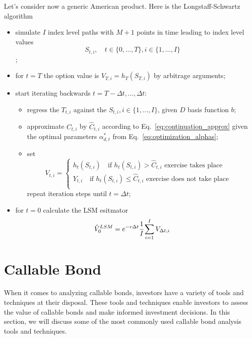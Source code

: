 \documentclass[12pt,a4paper]{article}
\begin{document}
Let's consider now a generic American product. Here is the Longstaff-Schwartz algorithm
\begin{itemize}
	\item simulate $I$ index level paths with $M+1$ points in time leading to index level values
	\begin{equation*}
		S_{t,i},\quad t \in \{0,\ldots,T\}, i \in \{1,\ldots,I\}
	\end{equation*};
\item for $t=T$ the option value is $V_{T,i}=h_T(S_{T,i})$ by arbitrage arguments;
\item start iterating backwards $t = T-\Delta t, \ldots,\Delta t$:
\begin{itemize}
	\item regress the $T_{t,i}$ against the $S_{t,i}, i\in \{1,\ldots, I\}$, given $D$ basis function $b$;
	\item approximate $C_{t,i}$ by $\hat{C}_{t,i}$ according to Eq.~\ref{eq:continuation_approx} given the optimal parameters $\alpha^*_{d,t}$ from Eq.~\ref{eq:optimization_alphas};
	\item set 
	\begin{equation*}
		V_{t,i}=
		\begin{cases}
			h_t(S_{t,i})\quad\text{if }h_t(S_{t,i})>\hat{C}_{t,i}\text{ exercise takes place}\\
			Y_{t,i}\quad\text{if }h_t(S_{t,i})\leq\hat{C}_{t,i}\text{ exercise does not take place}\\
		\end{cases}
	\end{equation*}
	repeat iteration steps until $t=\Delta t$;
\end{itemize} 
\item for $t=0$ calculate the LSM esitmator
\begin{equation}
	\hat{V}_0^{LSM}=e^{-r\Delta t}\cfrac{1}{I}\sum_{i=1}^{I}V_{\Delta t, i}
\end{equation} 
\end{itemize}

\clearpage
\section{Callable Bond}

When it comes to analyzing callable bonds, investors have a variety of tools and techniques at their disposal. These tools and techniques enable investors to assess the value of callable bonds and make informed investment decisions. In this section, we will discuss some of the most commonly used callable bond analysis tools and techniques.
\end{document}
